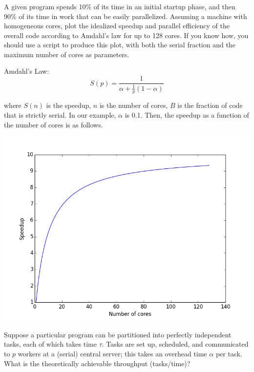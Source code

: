 \documentclass{5220hw}
\begin{document}

\maketitle

\begin{exercises}

\item A given program spends 10\% of its time in an initial startup phase, and then 90\% of its time in work that can be easily parallelized.  Assuming a machine with homogeneous cores, plot the idealized speedup and parallel efficiency of the overall code according to Amdahl's law for up to 128 cores.  If you know how, you should use a script to produce this plot, with both the serial fraction and the maximum number of cores as parameters.

Amdahl's Law: 
\begin{equation}
S(p) = \dfrac{1}{ \alpha + \frac{1}{p} (1 - \alpha)}
\end{equation}

where $S(n)$ is the speedup, $n$ is the number of cores, $B$ is the fraction of code that is strictly serial. In our example, $\alpha$ is 0.1. Then, the speedup as a function of the number of cores is as follows.

\includegraphics[scale=0.7]{speedup.png}

\item Suppose a particular program can be partitioned into perfectly independent tasks, each of which takes time $\tau$.  Tasks are set up, scheduled, and communicated to $p$ workers at a (serial) central server; this takes an overhead time $\alpha$ per task. What is the theoretically achievable throughput (tasks/time)?


\end{exercises}
\end{document}
